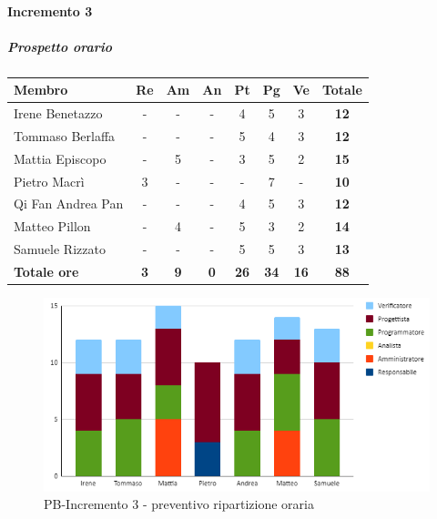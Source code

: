 \paragraph{Incremento 3}
\subparagraph{Prospetto orario}
\begin{center}
	\renewcommand{\arraystretch}{1.8} %
	\begin{tabular}{ |m{10em}|c|c|c|c|c|c|c| }
	\hline
	\textbf{Membro} & \textbf{Re} & \textbf{Am} &  \textbf{An} &  \textbf{Pt} &  \textbf{Pg} &  \textbf{Ve} &  \textbf{Totale}\\
    \hline
    Irene Benetazzo   & - & - & - & 4 & 5 & 3 & \textbf{12} \\
    \hline
    Tommaso Berlaffa  & - & - & - & 5 & 4 & 3 & \textbf{12} \\
    \hline
    Mattia Episcopo   & - & 5 & - & 3 & 5 & 2 & \textbf{15} \\
    \hline
    Pietro Macrì      & 3 & - & - & - & 7 & - & \textbf{10} \\
    \hline
    Qi Fan Andrea Pan & - & - & - & 4 & 5 & 3 & \textbf{12} \\
    \hline
    Matteo Pillon     & - & 4 & - & 5 & 3 & 2 & \textbf{14} \\
    \hline
    Samuele Rizzato   & - & - & - & 5 & 5 & 3 & \textbf{13} \\
    \hline
    \textbf{Totale ore} & \textbf{3} & \textbf{9} &  \textbf{0} &  \textbf{26} &  \textbf{34} &  \textbf{16} &  \textbf{88}\\
    \hline
	\end{tabular}
\end{center}
\begin{figure}[H]
   \centering\includegraphics{images/preventivo/PB-incremento3-ore.png}
   \caption{PB-Incremento 3 - preventivo ripartizione oraria}
\end{figure}


